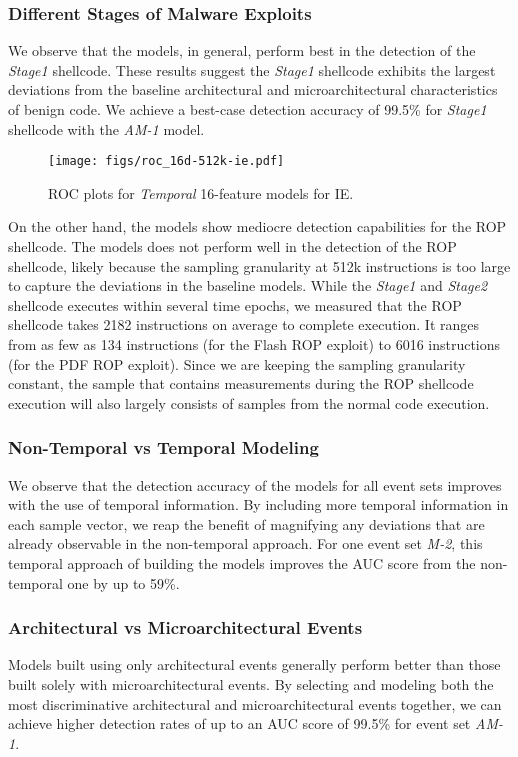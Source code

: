 \documentclass{acm_proc_article-sp}
\begin{document}
\subsubsection{Different Stages of Malware Exploits}
We observe that the models, in general, perform best in the detection of the \textit{Stage1} shellcode. These results suggest the \textit{Stage1} shellcode exhibits the largest deviations from the baseline architectural and microarchitectural characteristics of benign code. We achieve a best-case detection accuracy of 99.5\% for \textit{Stage1} shellcode with the \textit{AM-1} model.

\begin{figure}
  \centering
  \texttt{[image: figs/roc\_16d-512k-ie.pdf]}
  \caption{ROC plots for \emph{Temporal} 16-feature models for IE.}
  \label{fig:roc_16d-512k-ie}
\end{figure}

On the other hand, the models show mediocre detection capabilities for the ROP shellcode. The models does not perform well in the detection of the ROP shellcode, likely because the sampling granularity at 512k instructions is too large to capture the deviations in the baseline models. While the \textit{Stage1} and \textit{Stage2} shellcode executes within several time epochs, we measured that the ROP shellcode takes 2182 instructions on average to complete execution. It ranges from as few as 134 instructions (for the Flash ROP exploit) to 6016 instructions (for the PDF ROP exploit). Since we are keeping the sampling granularity constant, the sample that contains measurements during the ROP shellcode execution will also largely consists of samples from the normal code execution.




\subsubsection{Non-Temporal vs Temporal Modeling}
We observe that the detection accuracy of the models for all event sets improves with the use of temporal information. By including more temporal information in each sample vector, we reap the benefit of magnifying any deviations that are already observable in the non-temporal approach. For one event set \textit{M-2}, this temporal approach of building the models improves the AUC score from the non-temporal one by up to 59\%.

\subsubsection{Architectural vs Microarchitectural Events}
Models built using only architectural events generally perform better than those built solely with microarchitectural events. By selecting and modeling both the most discriminative architectural and microarchitectural events together, we can achieve higher detection rates of up to an AUC score of 99.5\% for event set \textit{AM-1}.
\end{document}
